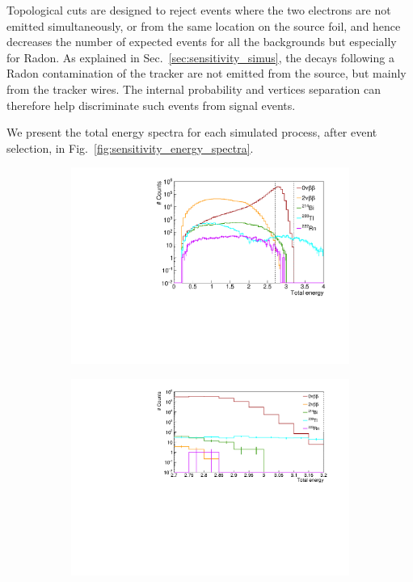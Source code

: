 Topological cuts are designed to reject events where the two electrons are not emitted simultaneously, or from the same location on the source foil, and hence decreases the number of expected events for all the backgrounds but especially for Radon.
As explained in Sec.~\ref{sec:sensitivity_simus}, the \Bi decays following a Radon contamination of the tracker are not emitted from the source, but mainly from the tracker wires.
The internal probability and vertices separation can therefore help discriminate such events from signal events.

We present the total energy spectra for each simulated process, after event selection, in Fig.~\ref{fig:sensitivity_energy_spectra}.
\begin{figure}[h]
\centering
\begin{subfigure}[t]{0.48\textwidth}
  \centering
  \includegraphics[width=1.1\textwidth]{Sensitivity/fig_sensitivity/energy_spectrum_with_B_82Se.pdf}
  \captionsetup{justification=centering}
  \caption{
    \label{subfig:sensitivity_energy_spectra_full}}
\end{subfigure}
\hfill
\begin{subfigure}[t]{0.48\textwidth}
  \centering
  \includegraphics[width=1.1\textwidth]{Sensitivity/fig_sensitivity/energy_spectrum_with_B_82Se_zoom.pdf}

\end{subfigure}
\end{figure}
